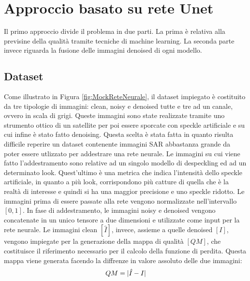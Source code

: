 
\chapter{Approccio basato su rete Unet}
Il primo approccio divide il problema in due parti. La prima è relativa alla previsine della qualità tramite tecniche 
di machine learning. La seconda parte invece riguarda la fusione delle immagini denoised di ogni modello.

\section{Dataset}

Come illustrato in Figura \ref{fig:MockReteNeurale}, il dataset impiegato è costituito da tre tipologie di 
immagini: clean, noisy e denoised tutte e tre ad un canale, ovvero in scala di grigi. Queste immagini sono state realizzate tramite uno strumento ottico di un
satellite per poi essere sporcate con speckle artificiale e su cui infine è stato fatto denoising. Questa scelta è stata fatta
in quanto risulta difficile reperire un dataset contenente immagini SAR abbastanza grande da poter essere utlizzato per 
addestrare una rete neurale. Le immagini su cui viene fatto l'addestramento sono relative ad un singolo modello di despeckling ed ad 
un determinato look. Quest'ultimo è una metrica che indica l'intensità dello speckle artificiale, in quanto a più look,
corrispondono più catture di quella che è la realtà di interesse e quindi si ha una maggior precisione e uno speckle ridotto.
Le immagini prima di essere passate alla rete vengono normalizzate nell'intervallo $[0,1]$.
In fase di addestramento, le immagini noisy e denoised vengono concatenate in un unico tensore a due dimensioni e utilizzate come 
input per la rete neurale. Le immagini clean $[\hat{I}]$, invece, assieme a quelle denoised $[I]$, vengono impiegate per la 
generazione della mappa di qualità $[QM]$, che costituisce il riferimento necessario per 
il calcolo della funzione di perdita. Questa mappa viene generata facendo la diffrenze in valore assoluto delle due immagini:
\begin{equation}
  \makebox[\textwidth][c]{%
    $\displaystyle
      QM = |\hat{I} - I |
    $%
  }
\end{equation}

